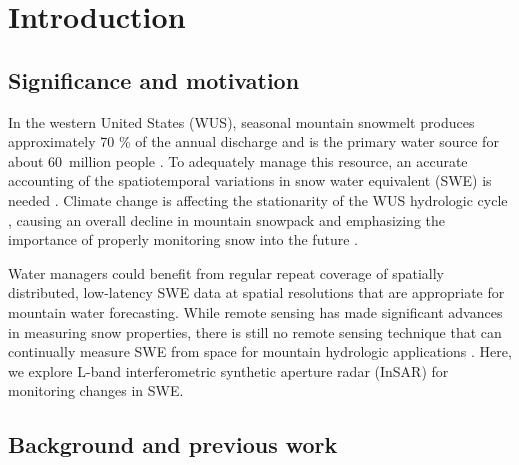 \hypertarget{ch3-intro}{\section{Introduction}\label{ch3-intro}}

\hypertarget{ch3-intro-1}{\subsection{Significance and motivation}\label{ch3-intro-1}}

In the western United States (WUS), seasonal mountain snowmelt produces approximately
70 \% of the annual discharge \citep{liHowMuchRunoff2017} and is the primary water source for about 60~million people \citep{stewartChangesSnowmeltRunoff2004}. To adequately
manage this resource, an accurate accounting of the spatiotemporal variations in snow water equivalent (SWE) is needed \citep{balesMountainHydrologyWestern2006}.
Climate change is affecting the stationarity of the WUS hydrologic cycle \citep{millyStationarityDeadWhither2008}, causing an overall decline in mountain snowpack \citep{moteDramaticDeclinesSnowpack2018} and emphasizing the importance of properly monitoring snow into the future \citep{siirila-woodburnLowtonoSnowFuture2021}.

Water managers could benefit from regular repeat coverage of spatially distributed, low-latency SWE data at spatial resolutions that are appropriate for mountain water forecasting. While remote sensing has made significant advances in measuring snow properties, there is still no remote sensing technique that can continually measure SWE from space for mountain hydrologic applications \citep{lettenmaierInroadsRemoteSensing2015}. Here, we explore L-band interferometric synthetic aperture radar (InSAR) for monitoring changes in SWE.

\hypertarget{ch3-intro-2}{\subsection{Background and previous work}\label{ch3-intro-2}}


